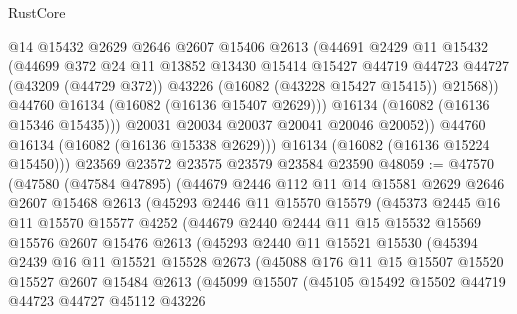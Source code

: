 \begin{lexlean}{RustCore}
\begin{coremodule}
                @14
                @15432
                @2629
                @2646
                @2607
                @15406
                @2613
                (@44691
                  @2429
                  @11
                  @15432
                  (@44699
                    @372
                    @24
                    @11
                    @13852
                    @13430
                    @15414
                    @15427
                    @44719
                    @44723
                    @44727
                    (@43209 (@44729 @372))
                    @43226
                    (@16082 (@43228 @15427 @15415))
                    @21568))
                @44760
                @16134
                (@16082 (@16136 @15407 @2629)))
              @16134
              (@16082 (@16136 @15346 @15435)))
            @20031
            @20034
            @20037
            @20041
            @20046
            @20052))
        @44760
        @16134
        (@16082 (@16136 @15338 @2629)))
      @16134
      (@16082 (@16136 @15224 @15450)))
    @23569
    @23572
    @23575
    @23579
    @23584
    @23590
@48059 := @47570
    (@47580
      (@47584 @47895)
      (@44679
        @2446
        @112
        @11
        @14
        @15581
        @2629
        @2646
        @2607
        @15468
        @2613
        (@45293
          @2446
          @11
          @15570
          @15579
          (@45373
            @2445
            @16
            @11
            @15570
            @15577
            @4252
            (@44679
              @2440
              @2444
              @11
              @15
              @15532
              @15569
              @15576
              @2607
              @15476
              @2613
              (@45293
                @2440
                @11
                @15521
                @15530
                (@45394
                  @2439
                  @16
                  @11
                  @15521
                  @15528
                  @2673
                  (@45088
                    @176
                    @11
                    @15
                    @15507
                    @15520
                    @15527
                    @2607
                    @15484
                    @2613
                    (@45099
                      @15507
                      (@45105
                        @15492
                        @15502
                        @44719
                        @44723
                        @44727
                        @45112
                        @43226

\end{coremodule}
\end{lexlean}
